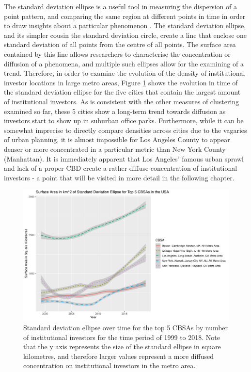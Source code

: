 The standard deviation ellipse is a useful tool in measuring the dispersion of a point pattern, and comparing the same region at different points in time in order to draw insights about a particular phenomenon \citep{Yuill1971}. The standard deviation ellipse, and its simpler cousin the standard deviation circle, create a line that enclose one standard deviation of all points from the centre of all points.  The surface area contained by this line allows researchers to characterise the concentration or diffusion of a phenomena, and multiple such ellipses allow for the examining of a trend. Therefore, in order to examine the evolution of the density of institutional investor locations in large metro areas, Figure \ref{fig:standarddeviationellipse} shows the evolution in time of the standard deviation ellipse for the five cities that contain the largest amount of institutional investors. As is consistent with the other measures of clustering examined so far, these 5 cities show a long-term trend towards diffusion as investors start to show up in suburban office parks. Furthermore, while it can be somewhat imprecise to directly compare densities across cities due to the vagaries of urban planning, it is almost impossible for Los Angeles County to appear denser or more concentrated in a particular metric than New York County (Manhattan). It is immediately apparent that Los Angeles' famous urban sprawl and lack of a proper CBD create a rather diffuse concentration of institutional investors - a point that will be visited in more detail in the following chapter.  
\begin{figure}[h]
	\centering
	\includegraphics[width=1\linewidth]{Figures/ChapterIII/Standard_Deviation_ellipse}
	\caption[Standard Deviation Ellipse]{Standard deviation ellipse over time for the top 5 CBSAs by number of institutional investors for the time period of 1999 to 2018. Note that the y axis represents the size of the standard ellipse in square kilometres, and therefore larger values represent a more diffused concentration on institutional investors in the metro area.}
	\label{fig:standarddeviationellipse}
\end{figure}

